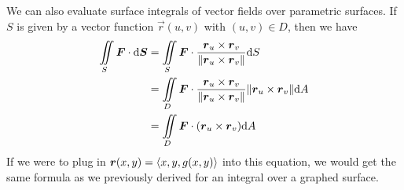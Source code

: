 We can also evaluate surface integrals of vector fields over parametric surfaces. If $S$ is given by a vector function $\vec r(u,v)$ with $(u,v)\in D$, then we have
\begin{align*}
    \iint\limits_S \boldsymbol{F} \cdot \dd \boldsymbol{S} &= \iint\limits_S \boldsymbol{F} \cdot \frac{\boldsymbol{r}_u \times \boldsymbol{r}_v}{\norm{\boldsymbol{r}_u \times \boldsymbol{r}_v}}\dd S \\
    &= \iint\limits_D \boldsymbol{F} \cdot \frac{\boldsymbol{r}_u \times \boldsymbol{r}_v}{\norm{\boldsymbol{r}_u \times \boldsymbol{r}_v}}\norm{\boldsymbol{r}_u \times \boldsymbol{r}_v}\dd A \\
    &= \iint\limits_D \boldsymbol{F} \cdot (\boldsymbol{r}_u \times \boldsymbol{r}_v)\dd A
\end{align*}
If we were to plug in $\boldsymbol{r}(x,y) = \left\langle x,y, g(x,y)\right\rangle$ into this equation, we would get the same formula as we previously derived for an integral over a graphed surface.
